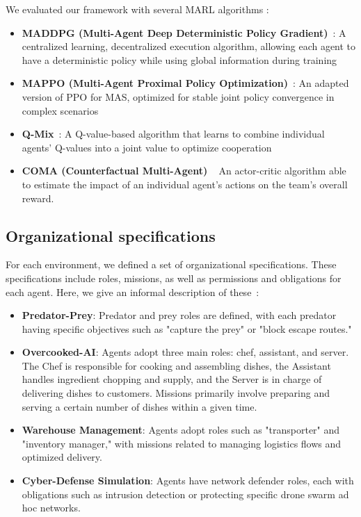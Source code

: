 \documentclass[pdflatex,sn-mathphys-num]{sn-jnl}%
\theoremstyle{thmstyleone}%
\theoremstyle{thmstyletwo}%
\theoremstyle{thmstylethree}%
\begin{document}
We evaluated our framework with several MARL algorithms :
%
\begin{itemize}
    \item \textbf{MADDPG (Multi-Agent Deep Deterministic Policy Gradient)}~\cite{lowe2017multi}: A centralized learning, decentralized execution algorithm, allowing each agent to have a deterministic policy while using global information during training
    
    \item \textbf{MAPPO (Multi-Agent Proximal Policy Optimization)}~\cite{yu2021mappo}: An adapted version of PPO for MAS, optimized for stable joint policy convergence in complex scenarios
    
    \item \textbf{Q-Mix}~\cite{rashid2018qmix}: A Q-value-based algorithm that learns to combine individual agents' Q-values into a joint value to optimize cooperation
    
    \item \textbf{COMA (Counterfactual Multi-Agent) }~\cite{foerster2018counterfactual} An actor-critic algorithm able to estimate the impact of an individual agent's actions on the team's overall reward.
\end{itemize}

\subsection{Organizational specifications}

For each environment, we defined a set of organizational specifications. These specifications include roles, missions, as well as permissions and obligations for each agent. Here, we give an informal description of these~\hyperref[fn:github]{\footnotemark[1]}:
%
\begin{itemize}
    \item \textbf{Predator-Prey}: Predator and prey roles are defined, with each predator having specific objectives such as "capture the prey" or "block escape routes."

    \item \textbf{Overcooked-AI}: Agents adopt three main roles: chef, assistant, and server. The Chef is responsible for cooking and assembling dishes, the Assistant handles ingredient chopping and supply, and the Server is in charge of delivering dishes to customers. Missions primarily involve preparing and serving a certain number of dishes within a given time.
    
    \item \textbf{Warehouse Management}: Agents adopt roles such as "transporter" and "inventory manager," with missions related to managing logistics flows and optimized delivery.
    
    \item \textbf{Cyber-Defense Simulation}: Agents have network defender roles, each with obligations such as intrusion detection or protecting specific drone swarm ad hoc networks.
\end{itemize}
\end{document}
